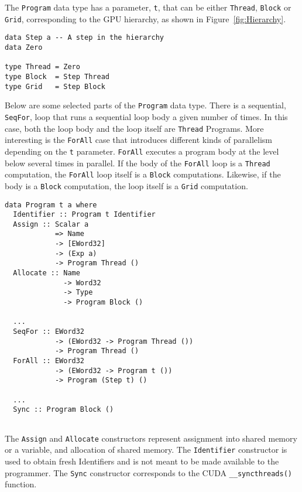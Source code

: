 The {\tt Program} data type has a parameter, {\tt t}, that can be 
either {\tt Thread}, {\tt Block} or {\tt Grid}, corresponding to 
the GPU hierarchy, as shown in Figure~\ref{fig:Hierarchy}.

\begin{small}
\begin{verbatim} 
data Step a -- A step in the hierarchy
data Zero
  
type Thread = Zero 
type Block  = Step Thread 
type Grid   = Step Block  
\end{verbatim} 
\end{small}


Below are some selected parts of the  {\tt Program} data type. There 
is a sequential, {\tt SeqFor}, loop that runs a sequential loop body a given 
number of times. In this case, both the loop body and the loop itself are 
{\tt Thread} Programs. More interesting is the {\tt ForAll} case that introduces 
 different kinds of parallelism depending on the {\tt t} parameter.
{\tt ForAll} executes a program body at the level below several times in parallel. 
If the body of the {\tt ForAll} loop is a {\tt Thread} computation, the {\tt ForAll} loop 
itself is a {\tt Block} computations. Likewise, if the body is a {\tt Block} computation, 
the loop itself is a {\tt Grid} computation. 

\begin{small} 
\begin{Verbatim}[samepage=true]
data Program t a where 
  Identifier :: Program t Identifier 
  Assign :: Scalar a
            => Name 
            -> [EWord32]
            -> (Exp a)
            -> Program Thread ()
  Allocate :: Name 
              -> Word32 
              -> Type 
              -> Program Block ()

  ... 
  SeqFor :: EWord32 
            -> (EWord32 -> Program Thread ())
            -> Program Thread ()
  ForAll :: EWord32 
            -> (EWord32 -> Program t ())
            -> Program (Step t) ()
 
  ... 
  Sync :: Program Block () 
   
\end{Verbatim}
\end{small} 

The {\tt Assign} and {\tt Allocate} constructors represent assignment into 
shared memory or a variable, and allocation of shared memory. The {\tt Identifier} 
constructor is used to obtain fresh Identifiers and is not meant to be made available
to the programmer. The {\tt Sync} constructor corresponds to the 
CUDA {\tt \_\_syncthreads()} function. 

